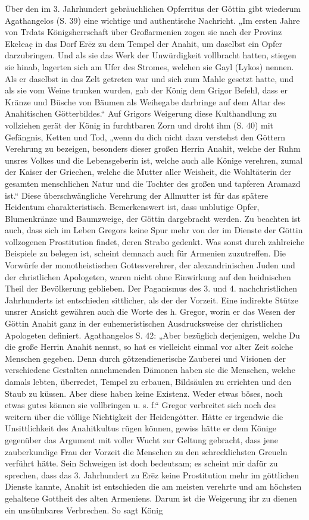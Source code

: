 \documentclass{article}
\begin{document}
Über den im 3. Jahrhundert gebräuchlichen Opferritus der Göttin gibt wiederum Agathangelos (S. 39) eine wichtige und authentische Nachricht. „Im ersten Jahre von Trdats Königsherrschaft über Großarmenien zogen sie nach der Provinz Ekełeac̣ in das Dorf Erēz zu dem Tempel der Anahit, um daselbst ein Opfer darzubringen. Und als sie das Werk der Unwürdigkeit vollbracht hatten, stiegen sie hinab, lagerten sich am Ufer des Stromes, welchen sie Gayl (Lykos) nennen. Als er daselbst in das Zelt getreten war und sich zum Mahle gesetzt hatte, und als sie vom Weine trunken wurden, gab der König dem Grigor Befehl, dass er Kränze und Büsche von Bäumen als Weihegabe darbringe auf dem Altar des Anahitischen Götterbildes.“ Auf Grigors Weigerung diese Kulthandlung zu vollziehen gerät der König in furchtbaren Zorn und droht ihm (S. 40) mit Gefängnis, Ketten und Tod, „wenn du dich nicht dazu verstehst den Göttern Verehrung zu bezeigen, besonders dieser großen Herrin Anahit, welche der Ruhm unsres Volkes und die Lebensgeberin ist, welche auch alle Könige verehren, zumal der Kaiser der Griechen, welche die Mutter aller Weisheit, die Wohltäterin der gesamten menschlichen Natur und die Tochter des großen und tapferen Aramazd ist.“ Diese überschwängliche Verehrung der Allmutter ist für das spätere Heidentum charakteristisch. Bemerkenswert ist, dass unblutige Opfer, Blumenkränze und Baumzweige, der Göttin dargebracht werden. Zu beachten ist auch, dass sich im Leben Gregors keine Spur mehr von der im Dienste der Göttin vollzogenen Prostitution findet, deren Strabo gedenkt. Was sonst durch zahlreiche Beispiele zu belegen ist, scheint demnach auch für Armenien zuzutreffen. Die Vorwürfe der monotheistischen Gottesverehrer, der alexandrinischen Juden und der christlichen Apologeten, waren nicht ohne Einwirkung auf den heidnischen Theil der Bevölkerung geblieben. Der Paganismus des 3. und 4. nachchristlichen Jahrhunderts ist entschieden sittlicher, als der der Vorzeit. Eine indirekte Stütze unsrer Ansicht gewähren auch die Worte des h. Gregor, worin er das Wesen der Göttin Anahit ganz in der euhemeristischen Ausdrucksweise der christlichen Apologeten definiert. Agathangelos S. 42: „Aber bezüglich derjenigen, welche Du die große Herrin Anahit nennst, so hat es vielleicht einmal vor alter Zeit solche Menschen gegeben. Denn durch götzendienerische Zauberei und Visionen der verschiedene Gestalten annehmenden Dämonen haben sie die Menschen, welche damals lebten, überredet, Tempel zu erbauen, Bildsäulen zu errichten und den Staub zu küssen. Aber diese haben keine Existenz. Weder etwas böses, noch etwas gutes können sie vollbringen u. s. f.“ Gregor verbreitet sich noch des weitern über die völlige Nichtigkeit der Heidengötter. Hätte er irgendwie die Unsittlichkeit des Anahitkultus rügen können, gewiss hätte er dem Könige gegenüber das Argument mit voller Wucht zur Geltung gebracht, dass jene zauberkundige Frau der Vorzeit die Menschen zu den schrecklichsten Greueln verführt hätte. Sein Schweigen ist doch bedeutsam; es scheint mir dafür zu sprechen, dass das 3. Jahrhundert zu Erēz keine Prostitution mehr im göttlichen Dienste kannte, Anahit ist entschieden die am meisten verehrte und am höchsten gehaltene Gottheit des alten Armeniens. Darum ist die Weigerung ihr zu dienen ein unsühnbares Verbrechen. So sagt König 
\end{document}
